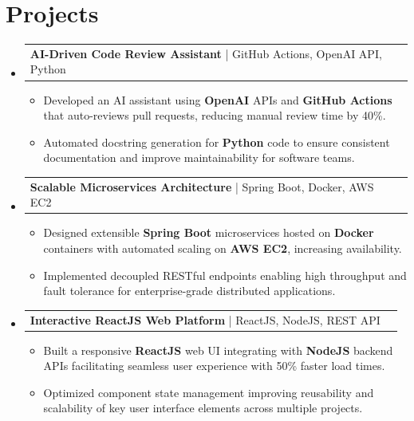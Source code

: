 \documentclass[letterpaper,11pt]{article}
\makeatletter
\newcommand{\resumeItem}[1]{
  \item\footnotesize{
    {#1 \vspace{-2pt}}
  }
}
\newcommand{\resumeProjectHeading}[2]{
    \item
    \begin{tabular*}{1.001\textwidth}{l@{\extracolsep{\fill}}r}
      \small#1 & \textbf{\small #2}\\
    \end{tabular*}\vspace{-7pt}
}
\newcommand{\resumeSubHeadingListStart}{\begin{itemize}[leftmargin=0pt, label={}]}
\newcommand{\resumeSubHeadingListEnd}{\end{itemize}}
\newcommand{\resumeItemListStart}{\begin{itemize}[leftmargin=*]}
\newcommand{\resumeItemListEnd}{\end{itemize}\vspace{-5pt}}
\makeatother
\begin{document}
\section{Projects}
    \vspace{-5pt}
    \resumeSubHeadingListStart
          \resumeProjectHeading
              {\textbf{AI-Driven Code Review Assistant} | GitHub Actions, OpenAI API, Python}{}
        \resumeItemListStart
            \resumeItem{Developed an AI assistant using \textbf{OpenAI} APIs and \textbf{GitHub Actions} that auto-reviews pull requests, reducing manual review time by 40\%.}
            \resumeItem{Automated docstring generation for \textbf{Python} code to ensure consistent documentation and improve maintainability for software teams.}
        \resumeItemListEnd
        \vspace{-12pt}
    
    \resumeProjectHeading
        {\textbf{Scalable Microservices Architecture} | Spring Boot, Docker, AWS EC2}{}
        \resumeItemListStart
            \resumeItem{Designed extensible \textbf{Spring Boot} microservices hosted on \textbf{Docker} containers with automated scaling on \textbf{AWS EC2}, increasing availability.}
            \resumeItem{Implemented decoupled RESTful endpoints enabling high throughput and fault tolerance for enterprise-grade distributed applications.}
        \resumeItemListEnd
          \vspace{-12pt}
      \resumeProjectHeading
          {\textbf{Interactive ReactJS Web Platform} | ReactJS, NodeJS, REST API}{}
          \resumeItemListStart
              \resumeItem{Built a responsive \textbf{ReactJS} web UI integrating with \textbf{NodeJS} backend APIs facilitating seamless user experience with 50\% faster load times.}
              \resumeItem{Optimized component state management improving reusability and scalability of key user interface elements across multiple projects.}
          \resumeItemListEnd 
    \resumeSubHeadingListEnd
\end{document}
